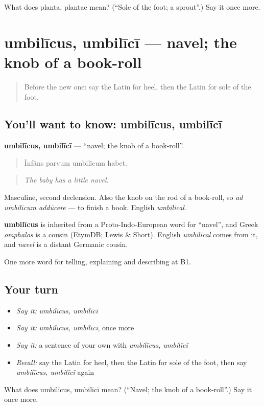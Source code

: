 \begin{tcolorbox}[breakable,colback=teal!4,colframe=teal!35!black,title={Before you move on}]
What does planta, plantae mean? (\textquotedblleft{}Sole of the foot; a sprout\textquotedblright{}.) Say it once more.
\end{tcolorbox}
\section[umbilīcus, umbilīcī]{umbilīcus, umbilīcī — navel; the knob of a book-roll}

\label{lesson:LA-C518-umbilicus}



\begin{quote}
Before the new one: say the Latin for heel, then the Latin for sole of the foot.
\end{quote}

\subsection*{You'll want to know: umbilīcus, umbilīcī}
\textbf{umbilīcus, umbilīcī} — \textquotedblleft{}navel; the knob of a book-roll\textquotedblright{}.

\begin{quote}
Īnfāns parvum umbilīcum habet.
\end{quote}

\begin{quote}
\emph{The baby has a little navel.}
\end{quote}

Masculine, second declension. Also the knob on the rod of a book-roll, so \emph{ad umbilīcum addūcere} — to finish a book. English \emph{umbilical}.

\begin{cousinweb}
\textbf{umbilīcus} is inherited from a Proto-Indo-European word for \textquotedblleft{}navel\textquotedblright{}, and Greek \emph{omphalos} is a cousin (EtymDB; Lewis \& Short). English \emph{umbilical} comes from it, and \emph{navel} is a distant Germanic cousin.
\end{cousinweb}

\begin{grammarlens}[title={What you've built}]
One more word for telling, explaining and describing at B1.
\end{grammarlens}

\subsection*{Your turn}
\begin{itemize}
\raggedright
  \item \emph{Say it:} \emph{umbilīcus, umbilīcī}
  \item \emph{Say it:} \emph{umbilīcus, umbilīcī}, once more
  \item \emph{Say it:} a sentence of your own with \emph{umbilīcus, umbilīcī}
  \item \emph{Recall:} say the Latin for heel, then the Latin for sole of the foot, then say \emph{umbilīcus, umbilīcī} again
\end{itemize}

\begin{tcolorbox}[breakable,colback=teal!4,colframe=teal!35!black,title={Before you move on}]
What does umbilīcus, umbilīcī mean? (\textquotedblleft{}Navel; the knob of a book-roll\textquotedblright{}.) Say it once more.
\end{tcolorbox}
